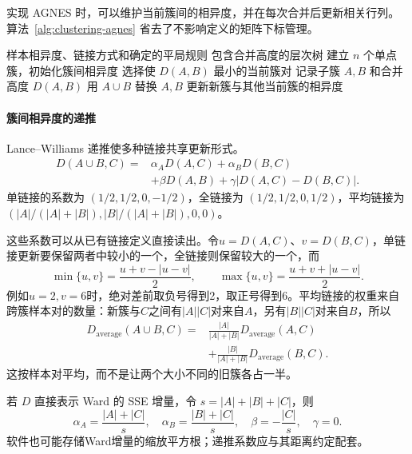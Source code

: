 实现 AGNES 时，可以维护当前簇间的相异度，并在每次合并后更新相关行列。算法~\ref{alg:clustering-agnes} 省去了不影响定义的矩阵下标管理。

\begin{algorithm}[凝聚层次聚类]
 \label{alg:clustering-agnes}
 \begin{algorithmic}[1]
 \Require 样本相异度、链接方式和确定的平局规则
 \Ensure 包含合并高度的层次树
 \State 建立 $n$ 个单点簇，初始化簇间相异度
  \State 选择使 $D(A,B)$ 最小的当前簇对
  \State 记录子簇 $A,B$ 和合并高度 $D(A,B)$
  \State 用 $A\cup B$ 替换 $A,B$
  \State 更新新簇与其他当前簇的相异度
 \EndWhile
 \end{algorithmic}
\end{algorithm}

\paragraph{簇间相异度的递推}

Lance--Williams 递推使多种链接共享更新形式。
\begin{equation}
 \begin{aligned}
 D(A\cup B,C)={}&\alpha_A D(A,C)+\alpha_B D(B,C)\\
 &+\beta D(A,B)
 +\gamma|D(A,C)-D(B,C)|.
 \end{aligned}
 \label{eq:clustering-lance-williams}
\end{equation}
单链接的系数为 $(1/2,1/2,0,-1/2)$，全链接为 $(1/2,1/2,0,1/2)$，平均链接为 $(|A|/(|A|+|B|),|B|/(|A|+|B|),0,0)$。

这些系数可以从已有链接定义直接读出。令$u=D(A,C)$、$v=D(B,C)$，单链接更新要保留两者中较小的一个，全链接则保留较大的一个，而
\[
 \min\{u,v\}=\frac{u+v-|u-v|}{2},\qquad
 \max\{u,v\}=\frac{u+v+|u-v|}{2}.
\]
例如$u=2,v=6$时，绝对差前取负号得到2，取正号得到6。平均链接的权重来自跨簇样本对的数量：新簇与$C$之间有$|A||C|$对来自$A$，另有$|B||C|$对来自$B$，所以
\[
 \begin{aligned}
 D_{\mathrm{average}}(A\cup B,C)
 ={}&\frac{|A|}{|A|+|B|}D_{\mathrm{average}}(A,C)\\
 &+\frac{|B|}{|A|+|B|}D_{\mathrm{average}}(B,C).
 \end{aligned}
\]
这按样本对平均，而不是让两个大小不同的旧簇各占一半。

若 $D$ 直接表示 Ward 的 SSE 增量，令 $s=|A|+|B|+|C|$，则
\[
 \alpha_A=\frac{|A|+|C|}{s},\quad
 \alpha_B=\frac{|B|+|C|}{s},\quad
 \beta=-\frac{|C|}{s},\quad \gamma=0.
\]
软件也可能存储Ward增量的缩放平方根；递推系数应与其距离约定配套。

